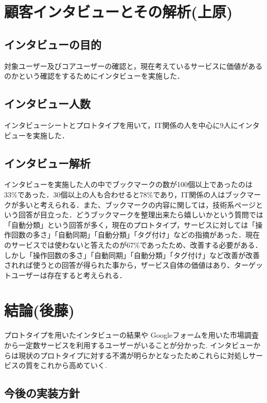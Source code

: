 \documentclass[a4paper,10pt,fleqn]{jsarticle}
\begin{document}
\newpage

\section{顧客インタビューとその解析(上原)}

\subsection{インタビューの目的}
対象ユーザー及びコアユーザーの確認と，現在考えているサービスに価値があるのかという確認をするためにインタビューを実施した．

\subsection{インタビュー人数}
インタビューシートとプロトタイプを用いて，IT関係の人を中心に9人にインタビューを実施した．

\subsection{インタビュー解析}
インタビューを実施した人の中でブックマークの数が100個以上であったのは33\%であった．30個以上の人も合わせると78\%であり，IT関係の人はブックマークが多いと考えられる．また、ブックマークの内容に関しては，技術系ページという回答が目立った．どうブックマークを整理出来たら嬉しいかという質問では「自動分類」という回答が多く，現在のプロトタイプ，サービスに対しては「操作回数の多さ」「自動同期」「自動分類」「タグ付け」などの指摘があった．現在のサービスでは使わないと答えたのが67\%であったため、改善する必要がある．しかし「操作回数の多さ」「自動同期」「自動分類」「タグ付け」など改善が改善されれば使うとの回答が得られた事から，ザービス自体の価値はあり、ターゲットユーザーは存在すると考えられる．

\section{結論(後藤)}
プロトタイプを用いたインタビューの結果や
Googleフォームを用いた市場調査から一定数サービスを利用するユーザーがいることが分かった.
インタビューからは現状のプロトタイプに対する不満が明らかとなったためこれらに対処しサービスの質をこれから高めていく.

\subsection{今後の実装方針}
\end{document}
